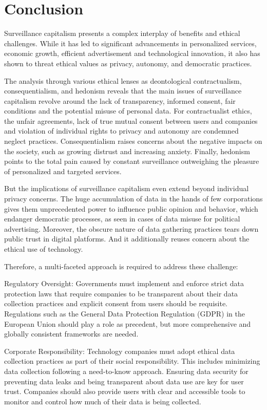 
\section{Conclusion}\label{sec:conclusion}
Surveillance capitalism presents a complex interplay of benefits and ethical challenges.
While it has led to significant advancements in personalized services, economic growth, efficient advertisement and technological innovation, it also has shown to threat ethical values as privacy, autonomy, and democratic practices.

The analysis through various ethical lenses as deontological contractualism, consequentialism, and hedonism reveals that the main issues of surveillance capitalism revolve around the lack of transparency, informed consent, fair conditions and the potential misuse of personal data.
For contractualist ethics, the unfair agreements, lack of true mutual consent between users and companies and violation of individual rights to privacy and autonomy are condemned neglect practices.
Consequentialism raises concerns about the negative impacts on the society, such as growing distrust and increasing anxiety.
Finally, hedonism points to the total pain caused by constant surveillance outweighing the pleasure of personalized and targeted services.

But the implications of surveillance capitalism even extend beyond individual privacy concerns.
The huge accumulation of data in the hands of few corporations gives them unprecedented power to influence public opinion and behavior, which endanger democratic processes, as seen in cases of data misuse for political advertising.
Moreover, the obscure nature of data gathering practices tears down public trust in digital platforms.
And it additionally reuses concern about the ethical use of technology.

Therefore, a multi-faceted approach is required to address these challenge:

Regulatory Oversight: Governments must implement and enforce strict data protection laws that require companies to be transparent about their data collection practices and explicit consent from users should be requisite.
Regulations such as the General Data Protection Regulation (GDPR) in the European Union should play a role as precedent, but more comprehensive and globally consistent frameworks are needed.

Corporate Responsibility: Technology companies must adopt ethical data collection practices as part of their social responsibility.
This includes minimizing data collection following a need-to-know approach.
Ensuring data security for preventing data leaks and being transparent about data use are key for user trust.
Companies should also provide users with clear and accessible tools to monitor and control how much of their data is being collected.

